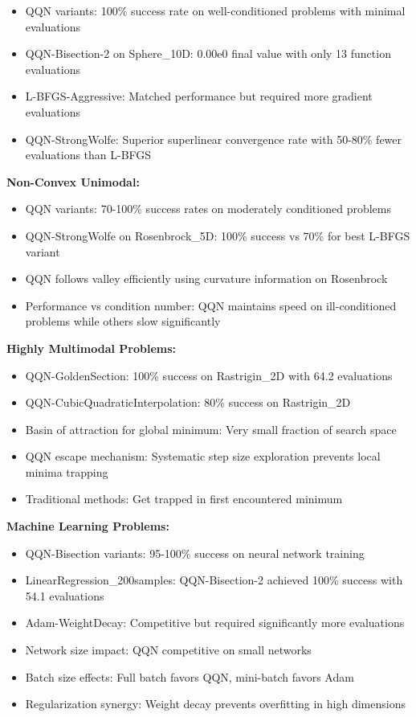 \begin{itemize}
\tightlist
\item
  QQN variants: 100\% success rate on well-conditioned problems with minimal evaluations
\item
  QQN-Bisection-2 on Sphere\_10D: 0.00e0 final value with only 13 function evaluations
\item
  L-BFGS-Aggressive: Matched performance but required more gradient evaluations
\item
  QQN-StrongWolfe: Superior superlinear convergence rate with 50-80\% fewer evaluations than L-BFGS
\end{itemize}

\textbf{Non-Convex Unimodal:}

\begin{itemize}
\tightlist
\item
  QQN variants: 70-100\% success rates on moderately conditioned problems
\item
  QQN-StrongWolfe on Rosenbrock\_5D: 100\% success vs 70\% for best L-BFGS variant
\item
  QQN follows valley efficiently using curvature information on Rosenbrock
\item
  Performance vs condition number: QQN maintains speed on ill-conditioned problems while others slow significantly
\end{itemize}

\textbf{Highly Multimodal Problems:}

\begin{itemize}
\tightlist
\item
  QQN-GoldenSection: 100\% success on Rastrigin\_2D with 64.2 evaluations
\item
  QQN-CubicQuadraticInterpolation: 80\% success on Rastrigin\_2D
\item
  Basin of attraction for global minimum: Very small fraction of search space
\item
  QQN escape mechanism: Systematic step size exploration prevents local minima trapping
\item
  Traditional methods: Get trapped in first encountered minimum
\end{itemize}

\textbf{Machine Learning Problems:}

\begin{itemize}
\tightlist
\item
  QQN-Bisection variants: 95-100\% success on neural network training
\item
  LinearRegression\_200samples: QQN-Bisection-2 achieved 100\% success with 54.1 evaluations
\item
  Adam-WeightDecay: Competitive but required significantly more evaluations
\item
  Network size impact: QQN competitive on small networks
\item
  Batch size effects: Full batch favors QQN, mini-batch favors Adam
\item
  Regularization synergy: Weight decay prevents overfitting in high dimensions
\end{itemize}


